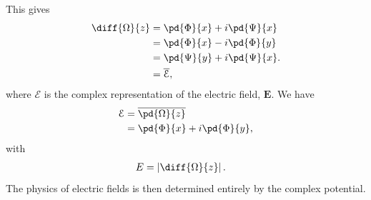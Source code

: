 \documentclass[10pt]{mypackage}
\begin{document}
This gives
\begin{align*}
  \diff{\Omega}{z} &= \pd{\Phi}{x} + i \pd{\Psi}{x}\\
                   &= \pd{\Phi}{x} - i\pd{\Phi}{y}\\
                   &= \pd{\Psi}{y} + i \pd{\Psi}{x}.\\
                   &= \overline{\mathcal{E}},
\end{align*}
where $\mathcal{E}$ is the complex representation of the electric field, $\mathbf{E}$. We have
\begin{align*}
  \mathcal{E} &= \overline{\pd{\Omega}{z}}\\
              &= \pd{\Phi}{x} + i\pd{\Phi}{y},
\end{align*}
with
\begin{align*}
  E &= \left\vert \diff{\Omega}{z} \right\vert.
\end{align*}
The physics of electric fields is then determined entirely by the complex potential.
\end{document}
